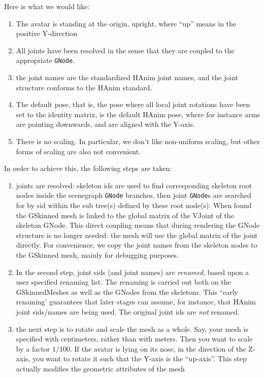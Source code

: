 \begin{enumerate}
Here is what we would like:
\begin{enumerate}
\item The avatar is standing at the origin, upright, where ``up'' means in the positive Y-direction
\item All joints have been resolved in the sense that they are coupled to the appropriate \verb"GNode".
\item the joint names are the standardized HAnim joint names, and the joint structure conforms to the
HAnim standard. 
\item The default pose, that is, the pose where all local joint rotations have been set to 
the identity matrix, is the default HAnim pose, where for instance arms are pointing downwards,
and are aligned with the Y-axis. 
\item There is no scaling. In particular, we don't like non-uniform scaling, but other forms of scaling are also
not convenient.

\end{enumerate}

In order to achieve this, the following steps are taken:

\begin{enumerate}
\item joints are resolved: skeleton ids are used to find corresponding skeleton root nodes inside
the scenegraph \verb"GNode" branches, then joint \verb"GNode"s are searched for by sid 
within the sub tree(s) defined by these root node(s).
When found the GSkinned mesh is linked to the global matrix of the VJoint of the skeleton GNode.
This direct coupling means that during rendering the GNode structure is no longer needed: the 
mesh will use the global matrix of the joint directly. 
For convenience, we copy the joint names from the skeleton nodes to the GSkinned mesh, mainly for debugging purposes.
\item In the second step, joint sids (and joint names) are \emph{renamed}, based upon a user specified
renaming list. The renaming is carried out both on the GSkinnedMeshes as well as the GNodes from the skeletons.
This ``early renaming' guarantees that later stages can assume, for instance, that HAnim joint sids/names
are being used. The original joint ids are \emph{not} renamed. 

\item the next step is to rotate and scale the mesh as a whole. Say, your mesh is specified with centimeters,
rather than with meters. Then you want to scale by a factor $1/100$. If the avatar
is lying on its nose, in the direction of the Z-axis, you want to rotate it such that the Y-axis is the ``up-axis''.
This step actually modifies the geometric attributes of the mesh
\end{enumerate}


\end{enumerate}
